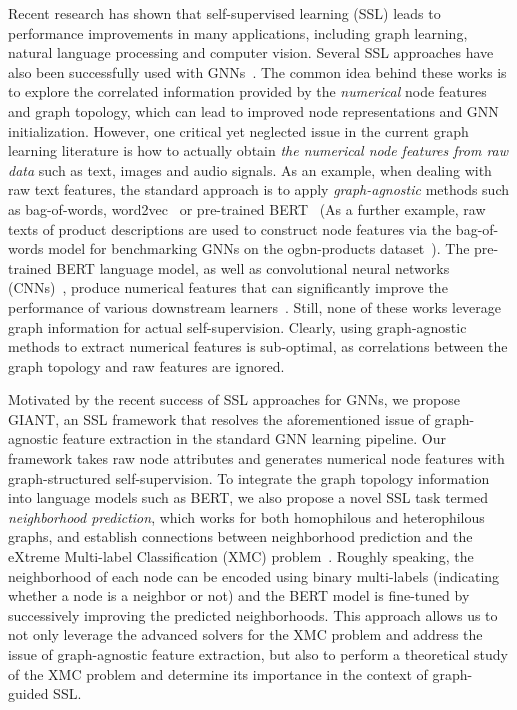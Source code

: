 \documentclass{article} %
\begin{document}
Recent research has shown that self-supervised learning (SSL) leads to performance improvements in many applications, including graph learning, natural language processing and computer vision. Several SSL approaches have also been successfully used with GNNs~\citep{Hu*2020Strategies,you2018graphrnn,you2020graph,hu2020gpt,velickovic2019deep,kipf2016variational,deng2020graphzoom}. The common idea behind these works is to explore the correlated information provided by the \emph{numerical} node features and graph topology, which can lead to improved node representations and GNN initialization. However, one critical yet neglected issue in the current graph learning literature is how to actually obtain \emph{the numerical node features from raw data} such as text, images and audio signals. As an example, when dealing with raw text features, the standard approach is to apply \emph{graph-agnostic} methods such as bag-of-words, word2vec~\citep{mikolov2013distributed} or pre-trained BERT~\citep{devlin2018bert} (As a further example, raw texts of product descriptions are used to construct node features via the bag-of-words model for benchmarking GNNs on the ogbn-products dataset~\citep{hu2020open,chiang2019cluster}). The pre-trained BERT language model, as well as convolutional neural networks (CNNs)~\citep{goyal2019scaling,kolesnikov2019revisiting}, produce numerical features that can significantly improve the performance of various downstream learners~\citep{devlin2018bert}. Still, none of these works leverage graph information for actual self-supervision. Clearly, using graph-agnostic methods to extract numerical features is sub-optimal, as correlations between the graph topology and raw features are ignored. 

Motivated by the recent success of SSL approaches for GNNs, we propose GIANT, an SSL framework that resolves the aforementioned issue of graph-agnostic feature extraction in the standard GNN learning pipeline. Our framework takes raw node attributes and generates numerical node features with graph-structured self-supervision. To integrate the graph topology information into language models such as BERT, we also propose a novel SSL task termed \emph{neighborhood prediction}, which works for both homophilous and heterophilous graphs, and establish connections between neighborhood prediction and the eXtreme Multi-label Classification (XMC) problem~\citep{shen2020extreme,yu2020pecos,chang2020taming}. Roughly speaking, the neighborhood of each node can be encoded using binary multi-labels (indicating whether a node is a neighbor or not) and the BERT model is fine-tuned by successively improving the predicted neighborhoods. This approach allows us to not only leverage the advanced solvers for the XMC problem and address the issue of graph-agnostic feature extraction, but also to perform a theoretical study of the XMC problem and determine its importance in the context of graph-guided SSL.  
\end{document}
